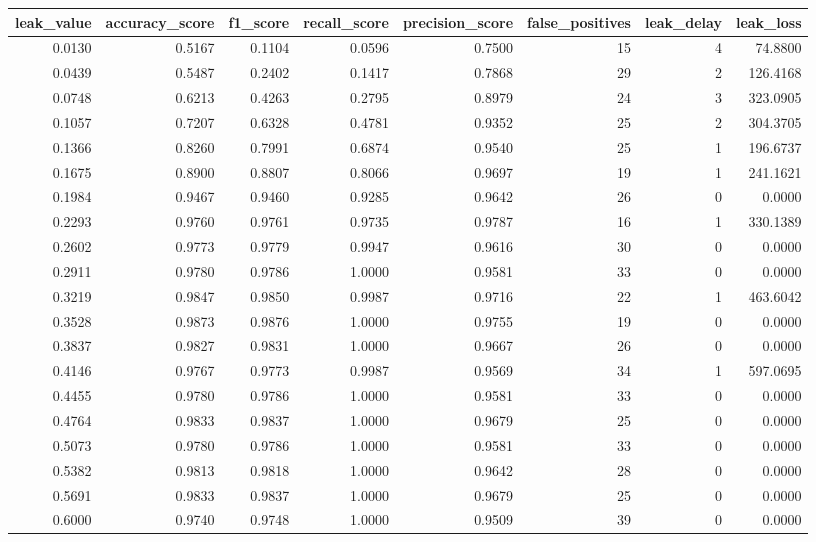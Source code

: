 \begin{tabular}{rrrrrrrr}
\toprule
leak\_value & accuracy\_score & f1\_score & recall\_score & precision\_score & false\_positives & leak\_delay & leak\_loss \\
\midrule
0.0130 & 0.5167 & 0.1104 & 0.0596 & 0.7500 & 15 & 4 & 74.8800 \\
0.0439 & 0.5487 & 0.2402 & 0.1417 & 0.7868 & 29 & 2 & 126.4168 \\
0.0748 & 0.6213 & 0.4263 & 0.2795 & 0.8979 & 24 & 3 & 323.0905 \\
0.1057 & 0.7207 & 0.6328 & 0.4781 & 0.9352 & 25 & 2 & 304.3705 \\
0.1366 & 0.8260 & 0.7991 & 0.6874 & 0.9540 & 25 & 1 & 196.6737 \\
0.1675 & 0.8900 & 0.8807 & 0.8066 & 0.9697 & 19 & 1 & 241.1621 \\
0.1984 & 0.9467 & 0.9460 & 0.9285 & 0.9642 & 26 & 0 & 0.0000 \\
0.2293 & 0.9760 & 0.9761 & 0.9735 & 0.9787 & 16 & 1 & 330.1389 \\
0.2602 & 0.9773 & 0.9779 & 0.9947 & 0.9616 & 30 & 0 & 0.0000 \\
0.2911 & 0.9780 & 0.9786 & 1.0000 & 0.9581 & 33 & 0 & 0.0000 \\
0.3219 & 0.9847 & 0.9850 & 0.9987 & 0.9716 & 22 & 1 & 463.6042 \\
0.3528 & 0.9873 & 0.9876 & 1.0000 & 0.9755 & 19 & 0 & 0.0000 \\
0.3837 & 0.9827 & 0.9831 & 1.0000 & 0.9667 & 26 & 0 & 0.0000 \\
0.4146 & 0.9767 & 0.9773 & 0.9987 & 0.9569 & 34 & 1 & 597.0695 \\
0.4455 & 0.9780 & 0.9786 & 1.0000 & 0.9581 & 33 & 0 & 0.0000 \\
0.4764 & 0.9833 & 0.9837 & 1.0000 & 0.9679 & 25 & 0 & 0.0000 \\
0.5073 & 0.9780 & 0.9786 & 1.0000 & 0.9581 & 33 & 0 & 0.0000 \\
0.5382 & 0.9813 & 0.9818 & 1.0000 & 0.9642 & 28 & 0 & 0.0000 \\
0.5691 & 0.9833 & 0.9837 & 1.0000 & 0.9679 & 25 & 0 & 0.0000 \\
0.6000 & 0.9740 & 0.9748 & 1.0000 & 0.9509 & 39 & 0 & 0.0000 \\
\bottomrule
\end{tabular}
